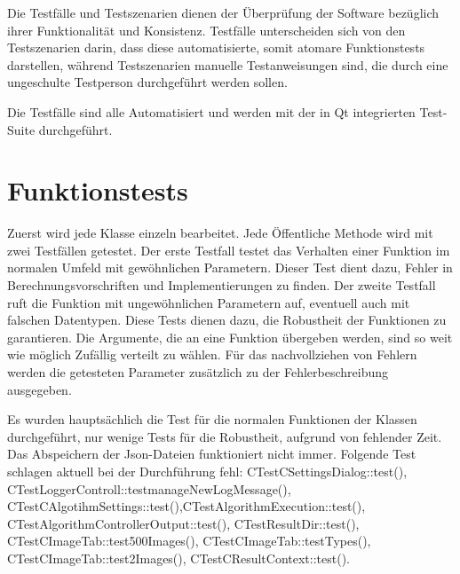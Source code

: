 Die Testfälle und Testszenarien dienen der Überprüfung der Software bezüglich ihrer Funktionalität und Konsistenz. Testfälle unterscheiden sich von den Testszenarien darin, dass diese automatisierte, somit atomare Funktionstests darstellen, während Testszenarien manuelle Testanweisungen sind, die durch eine ungeschulte Testperson durchgeführt werden sollen.

Die Testfälle sind alle Automatisiert und werden mit der in Qt integrierten Test-Suite durchgeführt.
\section{Funktionstests}
Zuerst wird jede Klasse einzeln bearbeitet. Jede Öffentliche Methode wird mit zwei Testfällen getestet. Der erste Testfall testet das Verhalten einer Funktion im normalen Umfeld mit gewöhnlichen Parametern. Dieser Test dient dazu, Fehler in Berechnungsvorschriften und Implementierungen zu finden. Der zweite Testfall ruft die Funktion mit ungewöhnlichen Parametern auf, eventuell auch mit falschen Datentypen. Diese Tests dienen dazu, die Robustheit der Funktionen zu garantieren. Die Argumente, die an eine Funktion übergeben werden, sind so weit wie möglich Zufällig verteilt zu wählen. Für das nachvollziehen von Fehlern werden die getesteten Parameter zusätzlich zu der Fehlerbeschreibung ausgegeben.

Es wurden hauptsächlich die Test für die normalen Funktionen der Klassen durchgeführt, nur wenige Tests für die Robustheit, aufgrund von fehlender Zeit. Das Abspeichern der Json-Dateien funktioniert nicht immer.
Folgende Test schlagen aktuell bei der Durchführung fehl: CTestCSettingsDialog::test(), CTestLoggerControll::testmanageNewLogMessage(), CTestCAlgotihmSettings::test(),CTestAlgorithmExecution::test(), CTestAlgorithmControllerOutput::test(), CTestResultDir::test(), CTestCImageTab::test500Images(), CTestCImageTab::testTypes(), CTestCImageTab::test2Images(), CTestCResultContext::test().


